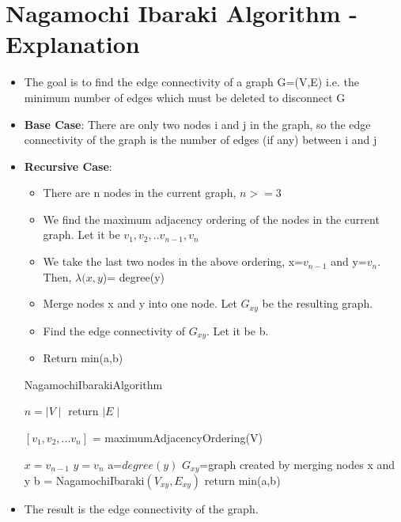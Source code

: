\documentclass[12pt,letterpaper,titlepage,en-US]{article}
\begin{document}
\section{Nagamochi Ibaraki Algorithm - Explanation}
\begin{itemize}


\item The goal is to find the edge connectivity of a graph G=(V,E) i.e. the minimum number of edges which must be deleted to disconnect G

\item \textbf{Base Case}: There are only two nodes i and j in the graph, so the edge connectivity of the graph  is the number of edges (if any) between i and j

\item \textbf{Recursive Case}: 
\begin{itemize}
\item There are n nodes in the current graph, $n>=3$
\item We find the maximum adjacency ordering of the nodes in the current graph. Let it be $v_{1},v_{2},..v_{n-1},v_{n}$

\item We take the last two nodes in the above ordering, x=$v_{n-1}$ and y=$v_{n}$. Then, $\lambda(x,y$)= degree(y)

\item Merge nodes x and y into one node. Let $G_{xy}$ be the resulting graph.

\item Find the edge connectivity of $G_{xy}$. Let it be b.

\item Return min(a,b)



\end{itemize}








\begin{algorithm}[H]
    \caption{NagamochiIbarakiAlgorithm}
    \begin{algorithmic}[1]
      
      \State $n= \mid V \mid$
      \State return $\mid E \mid$
      \EndIf
      
        
        \State $[v_{1},v_{2},...v_{n}]$ = maximumAdjacencyOrdering(V)
        
        \State $x=v_{n-1}$
        \State $y=v_{n}$
        \State a=$degree(y)$
        \State$ G_{xy}$=graph created by merging nodes x and y
        \State b = NagamochiIbaraki$(V_{xy}, E_{xy})$
        \State return min(a,b)
        
     
     
      
        \EndProcedure
    \end{algorithmic}
    \end{algorithm}


\item The result  is the edge connectivity of the graph.

\end{itemize}
\end{document}
